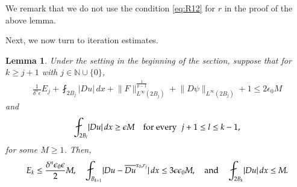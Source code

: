 \documentclass[reqno]{amsart}
\numberwithin{equation}{section}
\theoremstyle{plain}
\newtheorem{lemma}[theorem]{Lemma}
\theoremstyle{definition}
\theoremstyle{remark}
\providecommand{\abs}[1]{\lvert#1\rvert}
\providecommand{\norm}[1]{\lVert#1\rVert}
\begin{document}
We remark that we do not use the condition \eqref{eq:R12} for $r$ in the proof of the above lemma.


Next, we now turn to iteration estimates.



\begin{lemma} \label{lemma0413mon1}
Under the setting in the beginning of the section, suppose that for $k\geq j+1$ with $j\in \mathbb{N}\cup\{0\}$,
\begin{align}\label{eq0410fri4}
\frac{1}{\delta^n\epsilon}E_j +\fint_{2B_j}\abs{Du} \, dx +  \norm{F}_{L^\infty(2B_j)}
^{\frac{1}{p-1}}+\norm{D\psi}_{L^\infty(2B_j)} +1\leq 2\epsilon_0 M
\end{align}
and
\begin{align}\label{eq0410fri5}
\fint_{2B_{l} }\abs{Du}\, dx\geq \epsilon M  \quad\hbox{for every } \ j+1\leq l\leq k-1,
\end{align}
for some $M\geq 1$. Then,
\begin{align} \label{eq0412sun4}
E_k\leq \frac{\delta^n \epsilon_0 \epsilon}{2}M,\quad \fint_{B_{k+1}}\abs{Du -\overline{Du}^{x_0,r_j}} \, dx\leq 3\epsilon\epsilon_0  M,\quad\hbox{and}\quad\fint_{2B_k}\abs{Du}\,dx\leq M.
\end{align}
\end{lemma}
\end{document}

